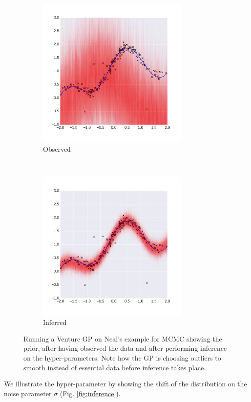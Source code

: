 \documentclass{article} %
\begin{document}
\begin{figure}
        \begin{subfigure}[b]{0.49\textwidth} \centering
                \includegraphics[height=7.5cm]{figs/neal_se_2final.png}
                \caption{Observed}
                \label{fig:NealAO))}
        \end{subfigure}
        ~ %
        \begin{subfigure}[b]{0.49\textwidth} \centering
                \includegraphics[height=7.5cm]{figs/neal_se_3final.png}
                \caption{Inferred}
                \label{fig:NealAI}
        \end{subfigure}
        \caption{Running a Venture GP on Neal's example for MCMC showing the prior, after having observed the data and after performing inference on the hyper-parameters. Note how the GP is choosing outliers to smooth instead of essential data before inference takes place. }\label{fig:neal}
\end{figure}
We illustrate the hyper-parameter by showing the shift of the distribution on the noise parameter $\sigma$ (Fig. \ref{fig:inference}).
\end{document}
